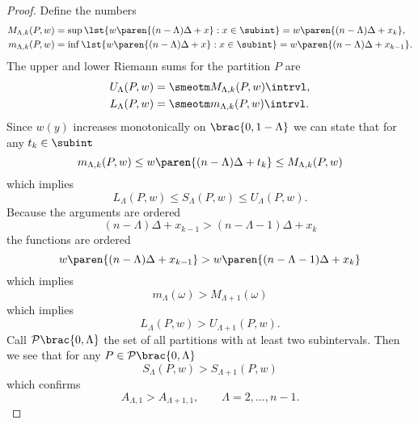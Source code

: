 \begin{proof}
Define the numbers
\begin{equation}
  \begin{split}
    M_{\Lambda,k}(P,w) 
      &= \sup \lst{w\paren{ (n-\Lambda)\Delta+x }: x \in \subint } = w\paren{ (n-\Lambda)\Delta+x_{k} }, \\
    m_{\Lambda,k}(P,w) &= \inf \lst{w\paren{ (n-\Lambda)\Delta+x }: x \in \subint } = w\paren{ (n-\Lambda)\Delta+x_{k-1} }. 
  \end{split}
\end{equation}
The upper and lower Riemann sums for the partition $P$ are
\begin{equation}
  \begin{split}
    U_{\Lambda}(P,w) &= \smeotm M_{\Lambda,k}(P,w) \intrvl, \\
    L_{\Lambda}(P,w) &= \smeotm m_{\Lambda,k}(P,w) \intrvl.
  \end{split}
\end{equation}
Since $w(y)$ increases monotonically on $\brac{0,1-\Lambda}$ we can state that for any $t_{k}\in\subint$
\begin{equation}
  m_{\Lambda,k}(P,w) \le w\paren{ (n-\Lambda)\Delta + t_{k} }\le M_{\Lambda,k}(P,w)
\end{equation}
which implies
\begin{equation}
  L_{\Lambda}(P,w) \le S_{\Lambda}(P,w) \le U_{\Lambda}(P,w).
\end{equation}
Because the arguments are ordered
\begin{equation}
  (n-\Lambda)\Delta + x_{k-1} > (n-\Lambda-1)\Delta + x_{k}
\end{equation}
the functions are ordered
\begin{equation}
  w\paren{ (n-\Lambda)\Delta + x_{k-1} } > w\paren{ (n-\Lambda-1)\Delta + x_{k} }
\end{equation}
which implies
\begin{equation}
  m_{\Lambda}(\omega) > M_{\Lambda+1}(\omega)
\end{equation}
which implies
\begin{equation}
  L_{\Lambda}(P,w) > U_{\Lambda+1}(P,w).
\end{equation}
Call $\mathcal{P}\brac{0,\Lambda}$ the set of all partitions with at least two subintervals. Then we see that for any $P\in\mathcal{P}\brac{0,\Lambda}$
\begin{equation}
  S_{\Lambda}(P,w) > S_{\Lambda+1}(P,w)
\end{equation}
which confirms
\begin{equation}
  A_{\Lambda,1} > A_{\Lambda+1,1}, \qquad \Lambda = 2, \dots, n-1 .
\end{equation}
\end{proof}

\endinput %